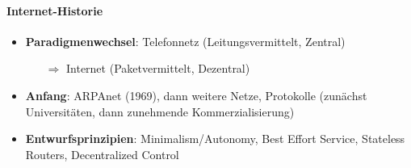 \paragraph{Internet-Historie}
\begin{itemize}
  \item \textbf{Paradigmenwechsel}: Telefonnetz (Leitungsvermittelt, Zentral)
  \begin{itemize}
    \item[\( \Rightarrow \)] Internet (Paketvermittelt, Dezentral)
  \end{itemize}
	\item \textbf{Anfang}: ARPAnet (1969), dann weitere Netze, Protokolle (zunächst Universitäten, dann zunehmende Kommerzialisierung)
	\item \textbf{Entwurfsprinzipien}: Minimalism/Autonomy, Best Effort Service, Stateless Routers, Decentralized Control
\end{itemize}